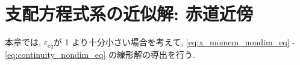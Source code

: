\chapter{支配方程式系の近似解: 赤道近傍}

本章では, $\varepsilon_{eq}$が 1 より十分小さい場合を考えて, 
\eqref{eq:x_momem_nondim_eq} - \eqref{eq:continuity_nondim_eq} の線形解の導出を行う. 
